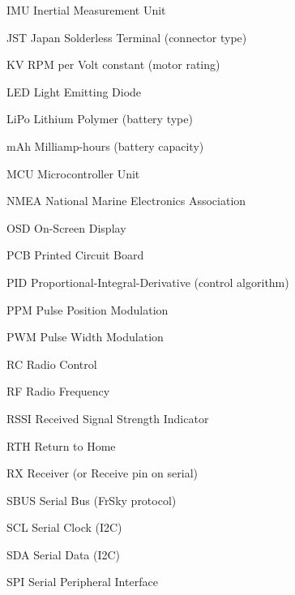 \documentclass[11pt,letterpaper]{article}
\begin{document}
IMU     Inertial Measurement Unit\par

JST     Japan Solderless Terminal (connector type)\par

KV      RPM per Volt constant (motor rating)\par

LED     Light Emitting Diode\par

LiPo    Lithium Polymer (battery type)\par

mAh     Milliamp-hours (battery capacity)\par

MCU     Microcontroller Unit\par

NMEA    National Marine Electronics Association\par

OSD     On-Screen Display\par

PCB     Printed Circuit Board\par

PID     Proportional-Integral-Derivative (control algorithm)\par

PPM     Pulse Position Modulation\par

PWM     Pulse Width Modulation\par

RC      Radio Control\par

RF      Radio Frequency\par

RSSI    Received Signal Strength Indicator\par

RTH     Return to Home\par

RX      Receiver (or Receive pin on serial)\par

SBUS    Serial Bus (FrSky protocol)\par

SCL     Serial Clock (I2C)\par

SDA     Serial Data (I2C)\par

SPI     Serial Peripheral Interface\par
\end{document}
